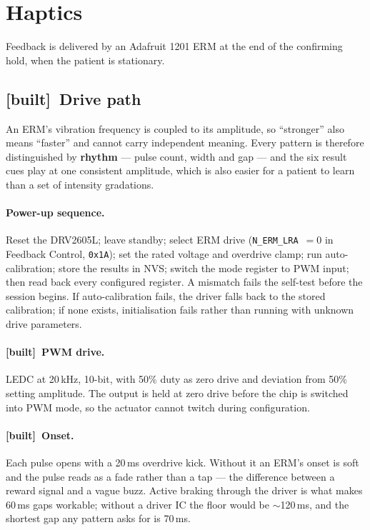 \documentclass[11pt]{article}
\newcommand{\built}{{\sffamily\scriptsize\color{good}\textbf{[built]}}\ }
\begin{document}
\section{Haptics}

Feedback is delivered by an Adafruit 1201 ERM at the end of the confirming
hold, when the patient is stationary.

\subsection{\built Drive path}

An ERM's vibration frequency is coupled to its amplitude, so ``stronger'' also
means ``faster'' and cannot carry independent meaning. Every pattern is
therefore distinguished by \textbf{rhythm} --- pulse count, width and gap ---
and the six result cues play at one consistent amplitude, which is also easier
for a patient to learn than a set of intensity gradations.

\paragraph{Power-up sequence.} Reset the DRV2605L; leave standby; select ERM
drive (\texttt{N\_ERM\_LRA}~$=0$ in Feedback Control, \texttt{0x1A}); set the
rated voltage and overdrive clamp; run auto-calibration; store the results in
NVS; switch the mode register to PWM input; then read back every configured
register. A mismatch fails the self-test before the session begins. If
auto-calibration fails, the driver falls back to the stored calibration; if
none exists, initialisation fails rather than running with unknown drive
parameters.

\paragraph{\built PWM drive.} LEDC at 20\,kHz, 10-bit, with 50\% duty as zero
drive and deviation from 50\% setting amplitude. The output is held at zero
drive before the chip is switched into PWM mode, so the actuator cannot twitch
during configuration.

\paragraph{\built Onset.} Each pulse opens with a 20\,ms overdrive kick.
Without it an ERM's onset is soft and the pulse reads as a fade rather than a
tap --- the difference between a reward signal and a vague buzz. Active
braking through the driver is what makes 60\,ms gaps workable; without a
driver IC the floor would be $\sim$120\,ms, and the shortest gap any pattern
asks for is 70\,ms.
\end{document}
